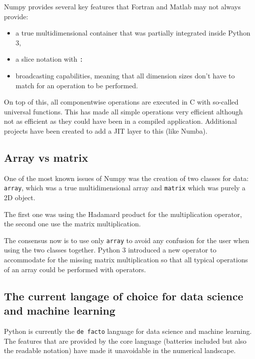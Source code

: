 Numpy provides several key features that Fortran and Matlab may
 not always provide:
 
\begin{itemize}  
  \item a true multidimensional container that was partially integrated
   inside Python 3,
  \item a slice notation with \texttt{:}
  \item broadcasting capabilities, meaning that all dimension sizes
  don't have to match for an operation to be performed.
\end{itemize}

On top of this, all componentwise operations are executed in C with so-called
 universal functions. This has made all simple operations very efficient
 although not as efficient as they could have been in a compiled application.
 Additional projects have been created to add a JIT layer to this (like Numba).

\subsection{Array vs matrix}
\label{S:Python:arraymatrix}

One of the most known issues of Numpy was the creation of two 
classes for data: \texttt{array}, which was a true multidimensional 
array and \texttt{matrix} which was purely a 2D object.

The first one was using the Hadamard product for the multiplication
 operator, the second one use the matrix multiplication.
  
The consensus now is to use only \texttt{array} to avoid any confusion
  for the user when using the two classes together. Python 3 introduced
  a new operator to accommodate for the missing matrix multiplication
  so that all typical operations of an array could be performed with 
  operators.

\subsection{The current langage of choice for data science and machine learning}
\label{S:Python:currentlanguage}

Python is currently the \texttt{de facto} language for data science and
 machine learning. The features that are provided by the core language
 (batteries included but also the readable notation) have made it 
 unavoidable in the numerical landscape.
 
